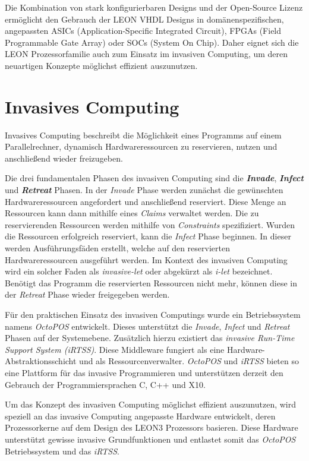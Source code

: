 Die Kombination von stark konfigurierbaren Designs und der Open-Source Lizenz ermöglicht den Gebrauch der
LEON VHDL Designs in domänenspezifischen, angepassten ASICs (Application-Specific Integrated Circuit),
FPGAs (Field Programmable Gate Array) oder SOCs (System On Chip). Daher eignet sich die LEON Prozessorfamilie
auch zum Einsatz im invasiven Computing, um deren neuartigen Konzepte möglichst effizient auszunutzen.
\cite{sparcv8Eval}

\section{Invasives Computing}

Invasives Computing beschreibt die Möglichkeit eines Programms auf einem Parallelrechner,
dynamisch Hardwareressourcen zu reservieren, nutzen und anschließend wieder freizugeben.\cite{octopos}

Die drei fundamentalen Phasen des invasiven Computing sind die \textit{\textbf{Invade}}, \textit{\textbf{Infect}}
und \textit{\textbf{Retreat}} Phasen. In der \textit{Invade} Phase werden zunächst die gewünschten
Hardwareressourcen angefordert und anschließend reserviert. Diese Menge an Ressourcen kann dann mithilfe
eines \textit{Claims} verwaltet werden. Die zu reservierenden Ressourcen werden mithilfe von \textit{Constraints}
spezifiziert.
Wurden die Ressourcen erfolgreich reserviert, kann die \textit{Infect}
Phase beginnen. In dieser werden Ausführungsfäden erstellt,
welche auf den reservierten Hardwareressourcen ausgeführt werden. Im Kontext des invasiven Computing wird ein solcher
Faden als \textit{invasive-let} oder abgekürzt als \textit{i-let} bezeichnet\cite{invasiveCommonTerms}.
Benötigt das Programm die reservierten Ressourcen nicht mehr, können diese in der \textit{Retreat} Phase wieder
freigegeben werden.\cite{octopos}

Für den praktischen Einsatz des invasiven Computings wurde ein Betriebssystem namens \textit{OctoPOS} entwickelt. 
Dieses unterstützt die \textit{Invade}, \textit{Infect} und \textit{Retreat} Phasen auf der Systemebene.
Zusätzlich hierzu existiert das \textit{invasive Run-Time Support System (iRTSS)}. Diese Middleware
fungiert als eine Hardware-Abstraktionsschicht und als Ressourcenverwalter.
\textit{OctoPOS} und \textit{iRTSS} bieten so eine Plattform für das invasive Programmieren und
unterstützen derzeit den Gebrauch der Programmiersprachen C, C++ und X10.
\cite{octopos}\cite{invasiveManyCore}\cite{invasiveRISC}

Um das Konzept des invasiven Computing möglichst effizient auszunutzen, wird speziell an das invasive Computing
angepasste Hardware entwickelt, deren Prozessorkerne auf dem Design des LEON3 Prozessors basieren.
Diese Hardware unterstützt gewisse invasive Grundfunktionen und entlastet somit das \textit{OctoPOS} Betriebssystem
und das \textit{iRTSS}.\cite{invasiveArrays}

